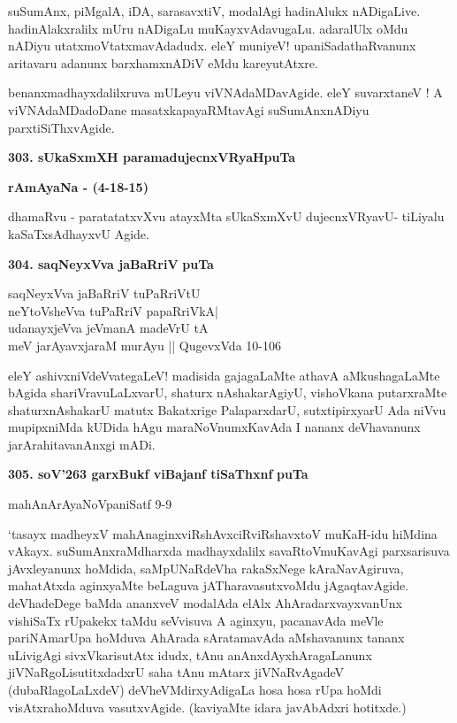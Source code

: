 \smallskip
suSumAnx, piMgalA, iDA, sarasavxtiV, modalAgi hadinAlukx nADigaLive. hadinAlakxralilx mUru nADigaLu muKayxvAdavugaLu. adaralUlx oMdu nADiyu utatxmoVtatxmavAdadudx. eleY muniyeV! upaniSadathaRvanunx aritavaru adanunx barxhamxnADiV eMdu kareyutAtxre.

benanxmadhayxdalilxruva mULeyu viVNAdaMDavAgide. eleY suvarxtaneV ! A viVNAdaMDadoDane masatxkapayaRMtavAgi suSumAnxnADiyu parxtiSiThxvAgide.

\medskip
\noindent
\textbf{303. sUkaSxmXH paramadujecnxVRyaH\hfill {\bf puTa }}

\hfill {\bf rAmAyaNa - (4-18-15)}

\smallskip
dhamaRvu - paratatatxvXvu atayxMta sUkaSxmXvU dujecnxVRyavU- tiLiyalu kaSaTxsAdhayxvU Agide.

\medskip
\noindent
\textbf{304. saqNeyxVva jaBaRriV} \hfill {\bf puTa }

\begin{shloka}
saqNeyxVva jaBaRriV tuPaRriVtU\\
neYtoVsheVva tuPaRriV papaRriVkA|\\
udanayxjeVva jeVmanA madeVrU tA\\
meV jarAyavxjaraM murAyu || \hfill{QugevxVda 10-106}
\end{shloka}

eleY ashivxniVdeVvategaLeV! madisida gajagaLaMte athavA aMkushagaLaMte bAgida shariVravuLaLxvarU, shaturx nAshakarAgiyU, vishoVkana putarxraMte shaturxnAshakarU matutx Bakatxrige PalaparxdarU, sutxtipirxyarU  Ada niVvu mupipxniMda kUDida hAgu maraNoVnumxKavAda I nananx deVhavanunx jarArahitavanAnxgi mADi.

\medskip
\noindent
\textbf{305. soV\char'263 garxBukf viBajanf tiSaThxnf} \hfill {\bf puTa }

\hfill mahAnArAyaNoVpaniSatf 9-9

\smallskip
`tasayx madheyxV mahAnaginxviRshAvxciRviRshavxtoV muKaH-idu hiMdina vAkayx. suSumAnxraMdharxda madhayxdalilx savaRtoVmuKavAgi parxsarisuva jAvxleyanunx hoMdida, saMpUNaRdeVha rakaSxNege kAraNavAgiruva, mahatAtxda aginxyaMte beLaguva jATharavasutxvoMdu jAgaqtavAgide. deVhadeDege baMda ananxveV modalAda elAlx AhAradarxvayxvanUnx vishiSaTx rUpakekx taMdu seVvisuva A aginxyu, pacanavAda meVle pariNAmarUpa hoMduva AhArada sAratamavAda aMshavanunx tananx uLivigAgi sivxVkarisutAtx idudx, tAnu anAnxdAyxhAragaLanunx jiVNaRgoLisutitxdadxrU saha tAnu mAtarx jiVNaRvAgadeV (dubaRlagoLaLxdeV) deVheVMdirxyAdigaLa hosa hosa rUpa hoMdi visAtxrahoMduva vasutxvAgide. (kaviyaMte idara javAbAdxri hotitxde.)

